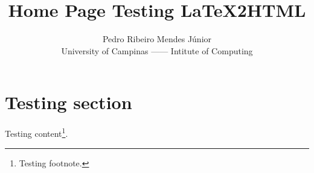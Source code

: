 \documentclass{article}
\title{Home Page Testing LaTeX2HTML}
\author{Pedro Ribeiro Mendes J\'{u}nior\\
  University of Campinas ------ Intitute of Computing}
\begin{document}
\maketitle

\section{Testing section}

Testing content\footnote{Testing footnote.}.
\end{document}
